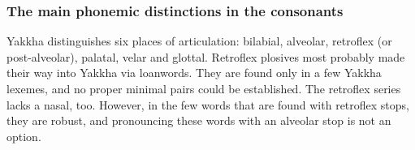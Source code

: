 \begin{table}[htp]
\caption{Yakkha consonant phonemes}\label{fig-consonants}
\end{table}


\subsubsection{The main phonemic distinctions in the consonants}


Yakkha distinguishes six places of articulation: bilabial, alveolar, retroflex (or post-alveolar), palatal, velar and glottal. Retroflex plosives most probably made their way into Yakkha via  loanwords. They are found only in a few Yakkha lexemes, and no proper minimal pairs could be established. The retroflex series lacks a nasal, too. However, in the few words that are found with retroflex stops, they are robust, and pronouncing these words with an alveolar stop is not an option. 

